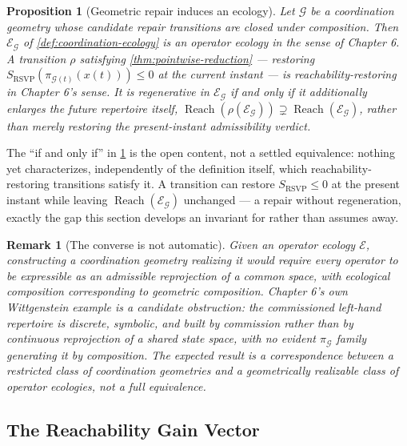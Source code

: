 \documentclass[12pt]{report}
\newtheorem{proposition}[definition]{Proposition}
\newtheorem{remark}[definition]{Remark}
\newcommand{\Reach}{\ensuremath{\operatorname{Reach}}}
\begin{document}
\begin{proposition}[Geometric repair induces an ecology]
\label{prop:geometric-regenerative}
Let $\mathcal{G}$ be a coordination geometry whose candidate repair
transitions are closed under composition. Then $\mathcal{E}_\mathcal{G}$
of \cref{def:coordination-ecology} is an operator ecology in the sense
of Chapter 6. A transition $\rho$ satisfying \cref{thm:pointwise-reduction}
--- restoring $S_{\mathrm{RSVP}}(\pi_{\mathcal{G}(t)}(x(t))) \leq 0$ at
the current instant --- is \emph{reachability-restoring} in Chapter 6's
sense. It is \emph{regenerative} in $\mathcal{E}_\mathcal{G}$ if and
only if it additionally enlarges the future repertoire itself,
$\Reach(\rho(\mathcal{E}_\mathcal{G})) \supsetneq \Reach(\mathcal{E}_\mathcal{G})$,
rather than merely restoring the present-instant admissibility verdict.
\end{proposition}

The ``if and only if'' in \cref{prop:geometric-regenerative} is the
open content, not a settled equivalence: nothing yet characterizes,
independently of the definition itself, which reachability-restoring
transitions satisfy it. A transition can restore
$S_{\mathrm{RSVP}} \leq 0$ at the present instant while leaving
$\Reach(\mathcal{E}_\mathcal{G})$ unchanged --- a repair without
regeneration, exactly the gap this section develops an invariant for
rather than assumes away.

\begin{remark}[The converse is not automatic]
\label{rem:converse-obstruction}
Given an operator ecology $\mathcal{E}$, constructing a coordination
geometry realizing it would require every operator to be expressible as
an admissible reprojection of a common space, with ecological
composition corresponding to geometric composition. Chapter 6's own
Wittgenstein example is a candidate obstruction: the commissioned
left-hand repertoire is discrete, symbolic, and built by commission
rather than by continuous reprojection of a shared state space, with no
evident $\pi_\mathcal{G}$ family generating it by composition. The
expected result is a correspondence between a restricted class of
coordination geometries and a geometrically realizable class of operator
ecologies, not a full equivalence.
\end{remark}

\subsection{The Reachability Gain Vector}
\label{sec:gain-vector}
\end{document}
